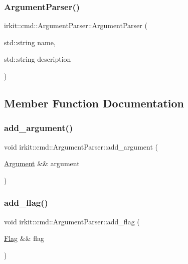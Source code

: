 \subsubsection{\texorpdfstring{Argument\+Parser()}{ArgumentParser()}}
{\footnotesize\ttfamily irkit\+::cmd\+::\+Argument\+Parser\+::\+Argument\+Parser (\begin{DoxyParamCaption}\item[{std\+::string}]{name,  }\item[{std\+::string}]{description }\end{DoxyParamCaption})\hspace{0.3cm}{\ttfamily [inline]}}



\subsection{Member Function Documentation}
\mbox{\label{classirkit_1_1cmd_1_1ArgumentParser_aa3ba2497953018934b66b7fc2989bd66}} 
\subsubsection{\texorpdfstring{add\+\_\+argument()}{add\_argument()}}
{\footnotesize\ttfamily void irkit\+::cmd\+::\+Argument\+Parser\+::add\+\_\+argument (\begin{DoxyParamCaption}\item[{\mbox{\hyperlink{classirkit_1_1cmd_1_1Argument}{Argument}} \&\&}]{argument }\end{DoxyParamCaption})\hspace{0.3cm}{\ttfamily [inline]}}

\mbox{\label{classirkit_1_1cmd_1_1ArgumentParser_a0915e82ef67a76359aa175448e4991bb}} 
\subsubsection{\texorpdfstring{add\+\_\+flag()}{add\_flag()}}
{\footnotesize\ttfamily void irkit\+::cmd\+::\+Argument\+Parser\+::add\+\_\+flag (\begin{DoxyParamCaption}\item[{\mbox{\hyperlink{classirkit_1_1cmd_1_1Flag}{Flag}} \&\&}]{flag }\end{DoxyParamCaption})\hspace{0.3cm}{\ttfamily [inline]}}

